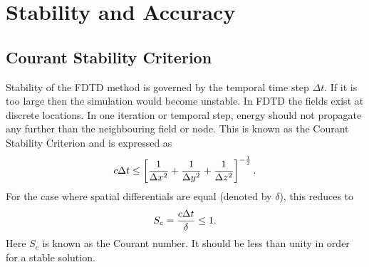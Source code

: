 \section{Stability and Accuracy}
\subsection{Courant Stability Criterion}
Stability of the FDTD method is governed by the temporal time step $\Delta t$. If it is too large then the simulation would become unstable. In FDTD the fields exist at discrete locations. In one iteration or temporal step, energy should not propagate any further than the neighbouring field or node. This is known as the Courant Stability Criterion and is expressed as
\begin{equation}
\centering
c \Delta t \leq \left[ \dfrac{1}{\Delta x^2} + \dfrac{1}{\Delta y^2} + \dfrac{1}{\Delta z^2} \right]^{-\frac{1}{2}}.
\label{Courant-Stability-Criterion}
\end{equation}
For the case where spatial differentials are equal (denoted by $\delta$), this reduces to
\begin{equation}
\centering
S_c = \dfrac{c \Delta t}{\delta} \leq 1.
\label{Courant-Stability-Criterion-Equal-Differentials}
\end{equation}
Here $S_c$ is known as the Courant number. It should be less than unity in order for a stable solution.
